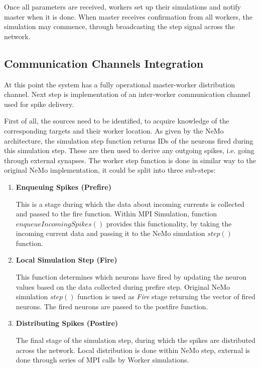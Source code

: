 Once all parameters are received, workers set up their simulations and notify master when it is done. When master receives confirmation from all workers, the simulation may commence, through broadcasting the step signal across the network. 

\subsection{Communication Channels Integration}

At this point the system has a fully operational master-worker distribution channel. Next step is implementation of an inter-worker communication channel used for spike delivery.

First of all, the sources need to be identified, to acquire knowledge of the corresponding targets and their worker location. As given by the NeMo architecture, the simulation step function returns IDs of the neurons fired during this simulation step. These are then used to derive any outgoing spikes, i.e. going through external synapses. The worker step function is done in similar way to the original NeMo implementation, it could be split into three sub-steps\cite{AndreasK.Fidjeland2009}:

\begin{enumerate}
\item {\textbf{Enqueuing Spikes (Prefire)}} 

This is a stage during which the data about incoming currents is collected and passed to the fire function.
Within MPI Simulation, function $enqueueIncomingSpikes()$ provides this functionality, by taking the incoming current data and passing it to the NeMo simulation $step()$ function.

\item {\textbf{Local Simulation Step (Fire)}}

This function determines which neurons have fired by updating the neuron values based on the data collected during prefire step. Original NeMo simulation $step()$ function is used as \emph{Fire} stage returning the vector of fired neurons. The fired neurons are passed to the postfire function.

\item {\textbf{Distributing Spikes (Postire)}}

The final stage of the simulation step, during which the spikes are distributed across the network. Local distribution is done within NeMo step, external is done through series of MPI calls by Worker simulations.
\end{enumerate}

